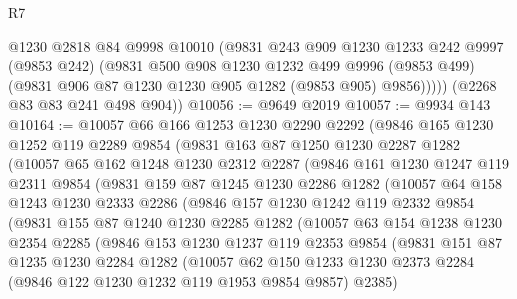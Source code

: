 \begin{lexlean}{R7}
\begin{coremodule}
          @1230
          @2818
          @84
          @9998
          @10010
          (@9831
            @243
            @909
            @1230
            @1233
            @242
            @9997
            (@9853 @242)
            (@9831
              @500
              @908
              @1230
              @1232
              @499
              @9996
              (@9853 @499)
              (@9831 @906 @87 @1230 @1230 @905 @1282 (@9853 @905) @9856)))))
      (@2268 @83 @83 @241 @498 @904))
@10056 := @9649 @2019
@10057 := @9934 @143
@10164 := @10057
    @66
    @166
    @1253
    @1230
    @2290
    @2292
    (@9846
      @165
      @1230
      @1252
      @119
      @2289
      @9854
      (@9831
        @163
        @87
        @1250
        @1230
        @2287
        @1282
        (@10057
          @65
          @162
          @1248
          @1230
          @2312
          @2287
          (@9846
            @161
            @1230
            @1247
            @119
            @2311
            @9854
            (@9831
              @159
              @87
              @1245
              @1230
              @2286
              @1282
              (@10057
                @64
                @158
                @1243
                @1230
                @2333
                @2286
                (@9846
                  @157
                  @1230
                  @1242
                  @119
                  @2332
                  @9854
                  (@9831
                    @155
                    @87
                    @1240
                    @1230
                    @2285
                    @1282
                    (@10057
                      @63
                      @154
                      @1238
                      @1230
                      @2354
                      @2285
                      (@9846
                        @153
                        @1230
                        @1237
                        @119
                        @2353
                        @9854
                        (@9831
                          @151
                          @87
                          @1235
                          @1230
                          @2284
                          @1282
                          (@10057
                            @62
                            @150
                            @1233
                            @1230
                            @2373
                            @2284
                            (@9846 @122 @1230 @1232 @119 @1953 @9854 @9857)
                            @2385)

\end{coremodule}
\end{lexlean}
